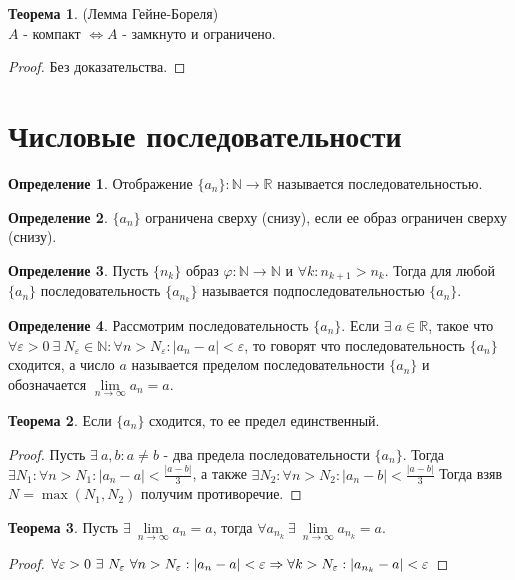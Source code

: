 \documentclass[a4paper, 12pt]{article}
\newcommand{\N}{\mathbb{N}}
\newcommand{\R}{\mathbb{R}}
\renewcommand{\phi}{\varphi}
\renewcommand{\epsilon}{\varepsilon}
\newcommand{\lra}{\Leftrightarrow}
\newcommand{\seq}{\{a_n\}}
\newcommand{\lims}{\lim\limits_{n\to \infty}}
\theoremstyle{definition}
\newtheorem*{definition}{Определение}
\newtheorem*{theorem}{Теорема}
\begin{document}
        \begin{theorem} (Лемма Гейне-Бореля)\\
            $A$ - компакт $\lra A$ - замкнуто и ограничено.
        \end{theorem} 
        \begin{proof}
            Без доказательства.
        \end{proof}
    \section{Числовые последовательности}
        \begin{definition}
            Отображение $\{a_n\}: \N\to \R$ называется последовательностью.
        \end{definition} 
        \begin{definition}
            $\{a_n\}$ ограничена сверху (снизу), если ее образ ограничен сверху (снизу).
        \end{definition} 
        \begin{definition}
            Пусть $\{n_k\}$ образ $\phi: \N\to \N$ и $\forall k: n_{k+1}>n_k$. Тогда для любой $\seq$ последовательность $\{a_{n_k}\}$ называется подпоследовательностью $\seq$.
        \end{definition} 
        \begin{definition}
            Рассмотрим последовательность $\seq$. Если $\exists \ a\in \R$, такое что $\forall \epsilon>0\ \exists\ N_{\epsilon}\in \N: \forall n>N_{\epsilon}: |a_n-a|<\epsilon$, то говорят что последовательность $\seq$ сходится, а число $a$ называется пределом последовательности $\seq$ и обозначается $\lims a_n=a$.
        \end{definition}
        \begin{theorem}
            Если $\seq$ сходится, то ее предел единственный.
        \end{theorem} 
        \begin{proof}
            Пусть $\exists\ a,b: a\ne b$ - два предела последовательности $\seq$. Тогда $\exists N_1: \forall n>N_1: |a_n-a|<\frac{|a-b|}{3}$, а также $\exists N_2: \forall n>N_2: |a_n-b|<\frac{|a-b|}{3}$ Тогда взяв $N = \max{(N_1, N_2)}$ получим противоречие.
        \end{proof} 
        \begin{theorem}
            Пусть $\exists\ \lims a_n=a$, тогда $\forall a_{n_k}\ \exists\ \lims a_{n_k}=a$.
        \end{theorem} 
        \begin{proof}
            $\forall \epsilon>0\ \exists\ N_{\epsilon}\ \forall n>N_{\epsilon}: |a_n-a|<\epsilon \Rightarrow \forall k>N_{\epsilon}:\\ |a_{n_k}-a|<\epsilon$
        \end{proof} 
\end{document}
